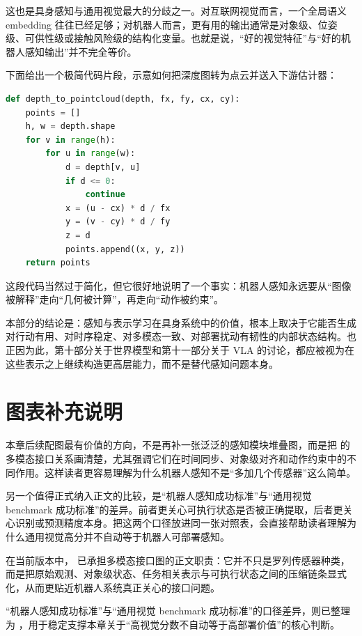 这也是具身感知与通用视觉最大的分歧之一。对互联网视觉而言，一个全局语义 embedding 往往已经足够；对机器人而言，更有用的输出通常是对象级、位姿级、可供性级或接触风险级的结构化变量。也就是说，“好的视觉特征”与“好的机器人感知输出”并不完全等价。

下面给出一个极简代码片段，示意如何把深度图转为点云并送入下游估计器：

\begin{lstlisting}[language=python]
def depth_to_pointcloud(depth, fx, fy, cx, cy):
    points = []
    h, w = depth.shape
    for v in range(h):
        for u in range(w):
            d = depth[v, u]
            if d <= 0:
                continue
            x = (u - cx) * d / fx
            y = (v - cy) * d / fy
            z = d
            points.append((x, y, z))
    return points
\end{lstlisting}

这段代码当然过于简化，但它很好地说明了一个事实：机器人感知永远要从“图像被解释”走向“几何被计算”，再走向“动作被约束”。

本部分的结论是：感知与表示学习在具身系统中的价值，根本上取决于它能否生成对行动有用、对时序稳定、对多模态一致、对部署扰动有韧性的内部状态结构。也正因为此，第十部分关于世界模型和第十一部分关于 VLA 的讨论，都应被视为在这些表示之上继续构造更高层能力，而不是替代感知问题本身。

\chapter*{图表补充说明}

本章后续配图最有价值的方向，不是再补一张泛泛的感知模块堆叠图，而是把  的多模态接口关系画清楚，尤其强调它们在时间同步、对象级对齐和动作约束中的不同作用。这样读者更容易理解为什么机器人感知不是“多加几个传感器”这么简单。

另一个值得正式纳入正文的比较，是“机器人感知成功标准”与“通用视觉 benchmark 成功标准”的差异。前者更关心可执行状态是否被正确提取，后者更关心识别或预测精度本身。把这两个口径放进同一张对照表，会直接帮助读者理解为什么通用视觉高分并不自动等于机器人可部署感知。

在当前版本中，\texttt{} 已承担多模态接口图的正文职责：它并不只是罗列传感器种类，而是把原始观测、对象级状态、任务相关表示与可执行状态之间的压缩链条显式化，从而更贴近机器人系统真正关心的接口问题。

“机器人感知成功标准”与“通用视觉 benchmark 成功标准”的口径差异，则已整理为 \texttt{}，用于稳定支撑本章关于“高视觉分数不自动等于高部署价值”的核心判断。

